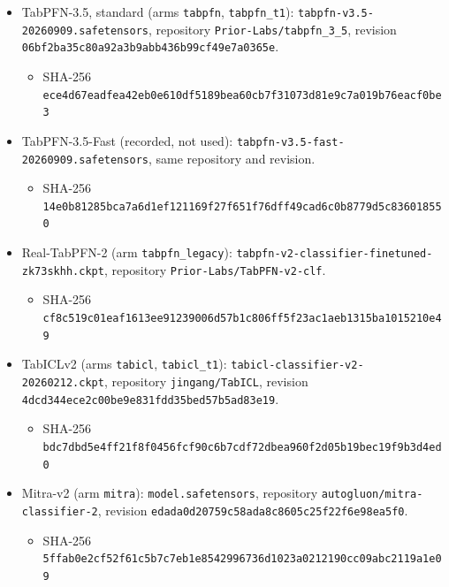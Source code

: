 \documentclass[
  10pt,
]{article}
\providecommand{\tightlist}{%
  \setlength{\itemsep}{0pt}\setlength{\parskip}{0pt}}
\begin{document}
\begin{itemize}
\tightlist
\item
  TabPFN-3.5, standard (arms \texttt{tabpfn},
  \texttt{tabpfn\_t1}):
  \texttt{tabpfn-v3.5-20260909.safetensors}, repository
  \texttt{Prior-Labs/tabpfn\_3\_5}, revision
  \texttt{06bf2ba35c80a92a3b9abb436b99cf49e7a0365e}.

  \begin{itemize}
  \tightlist
  \item
    SHA-256
    \texttt{ece4d67eadfea42eb0e610df5189bea60cb7f31073d81e9c7a019b76eacf0be3}
  \end{itemize}
\item
  TabPFN-3.5-Fast (recorded, not used):
  \texttt{tabpfn-v3.5-fast-20260909.safetensors}, same
  repository and revision.

  \begin{itemize}
  \tightlist
  \item
    SHA-256
    \texttt{14e0b81285bca7a6d1ef121169f27f651f76dff49cad6c0b8779d5c836018550}
  \end{itemize}
\item
  Real-TabPFN-2 (arm \texttt{tabpfn\_legacy}):
  \texttt{tabpfn-v2-classifier-finetuned-zk73skhh.ckpt},
  repository \texttt{Prior-Labs/TabPFN-v2-clf}.

  \begin{itemize}
  \tightlist
  \item
    SHA-256
    \texttt{cf8c519c01eaf1613ee91239006d57b1c806ff5f23ac1aeb1315ba1015210e49}
  \end{itemize}
\item
  TabICLv2 (arms \texttt{tabicl}, \texttt{tabicl\_t1}):
  \texttt{tabicl-classifier-v2-20260212.ckpt}, repository
  \texttt{jingang/TabICL}, revision
  \texttt{4dcd344ece2c00be9e831fdd35bed57b5ad83e19}.

  \begin{itemize}
  \tightlist
  \item
    SHA-256
    \texttt{bdc7dbd5e4ff21f8f0456fcf90c6b7cdf72dbea960f2d05b19bec19f9b3d4ed0}
  \end{itemize}
\item
  Mitra-v2 (arm \texttt{mitra}): \texttt{model.safetensors},
  repository \texttt{autogluon/mitra-classifier-2}, revision
  \texttt{edada0d20759c58ada8c8605c25f22f6e98ea5f0}.

  \begin{itemize}
  \tightlist
  \item
    SHA-256
    \texttt{5ffab0e2cf52f61c5b7c7eb1e8542996736d1023a0212190cc09abc2119a1e09}
  \end{itemize}
\end{itemize}
\end{document}
